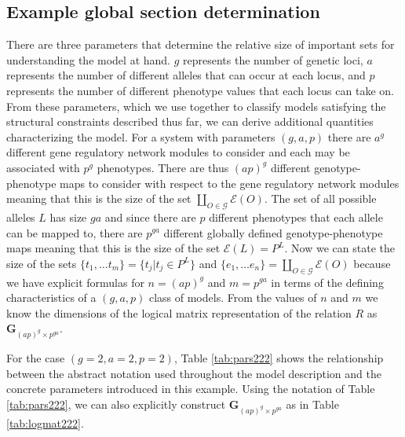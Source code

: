 \documentclass[10pt]{article}
\begin{document}
\subsection*{Example global section determination}
There are three parameters that determine the relative size of important sets for understanding the model at hand. $g$ represents the number of genetic loci, $a$ represents the number of different alleles that can occur at each locus, and $p$ represents the number of different phenotype values that each locus can take on. From these parameters, which we use together to classify models satisfying the structural constraints described thus far, we can derive additional quantities characterizing the model. For a system with parameters $(g,a,p)$ there are $a^g$ different gene regulatory network modules to consider and each may be associated with $p^g$ phenotypes. There are thus $(ap)^g$ different genotype-phenotype maps to consider with respect to the gene regulatory network modules meaning that this is the size of the set $\coprod_{O \in \mathcal{G}} \mathcal{E}(O)$. The set of all possible alleles $L$ has size $ga$ and since there are $p$ different phenotypes that each allele can be mapped to, there are $p^{ga}$ different globally defined genotype-phenotype maps meaning that this is the size of the set $\mathcal{E}(L) = P^L$. Now we can state the size of the sets $\{t_1, \ldots t_m\} = \{t_j | t_j \in P^L\}$ and $\{e_1, \ldots e_n\} = \coprod_{O \in \mathcal{G}} \mathcal{E}(O)$ because we have explicit formulas for $n = (ap)^g$ and $m = p^{ga}$ in terms of the defining characteristics of a $(g,a,p)$ class of models. From the values of $n$ and $m$ we know the dimensions of the logical matrix representation of the relation $R$ as $\mathbf{G}_{(ap)^g \times p^{ga}}$.

For the case $(g=2,a=2,p=2)$, Table \ref{tab:pars222} shows the relationship between the abstract notation used throughout the model description and the concrete parameters introduced in this example. Using the notation of Table \ref{tab:pars222}, we can also explicitly construct $\mathbf{G}_{(ap)^g \times p^{ga}}$ as in Table \ref{tab:logmat222}.
\end{document}
